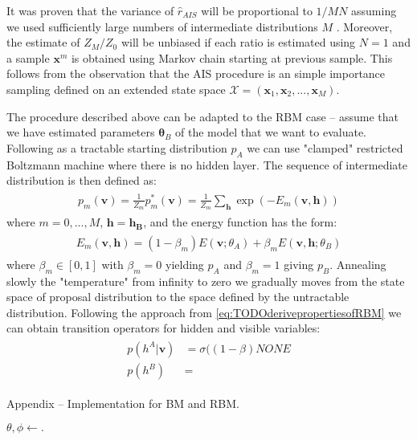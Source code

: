 \documentclass[../report/report.tex]{subfiles}
\begin{document}
It was proven that the variance of $\hat{r}_{AIS}$ will be proportional to $1 / MN$ assuming we used sufficiently large numbers of intermediate distributions $M$ \cite{neal2001annealed}. Moreover, the estimate of $Z_M / Z_0$ will be unbiased if each ratio is estimated using $N=1$ and a sample $\mathbf{x}^{m}$ is obtained using Markov chain starting at previous sample. This follows from the observation that the AIS procedure is an simple importance sampling defined on an extended state space $\mathcal{X} = (\mathbf{x}_1, \mathbf{x}_2, ..., \mathbf{x}_M)$.

The procedure described above can be adapted to the RBM case -- assume that we have estimated parameters $\mathbf{\theta}_B$ of the model that we want to evaluate. Following \cite{salakhutdinov2008quantitative} as a tractable starting distribution $p_A$ we can use "clamped" restricted Boltzmann machine where there is no hidden layer. The sequence of intermediate distribution is then defined as:
 \begin{align}
\begin{split}
p_m(\mathbf{v}) = \frac{1}{Z_m}p^*_m(\mathbf{v}) = \frac{1}{Z_m}\sum_\mathbf{h} \exp(-E_m(\mathbf{v, h}))
\end{split}
\end{align}
where $m = 0, ..., M$, $\mathbf{h} = \mathbf{h_B}$, and the energy function has the form:
 \begin{align}
\begin{split}
E_m(\mathbf{v,h}) = (1- \beta_m) E(\mathbf{v} ;\theta_A) + \beta_m E(\mathbf{v, h} ;\theta_B) 
\end{split}
\end{align}
where $\beta_m \in [0, 1]$ with $\beta_m = 0$ yielding $p_A$ and $\beta_m = 1$ giving $p_B$. Annealing slowly the "temperature" from infinity to zero we  gradually moves from the state space of proposal distribution to the space defined by the untractable distribution. Following the approach from \ref{eq:TODOderivepropertiesofRBM} we can obtain transition operators for hidden and visible variables:
 \begin{align}
\begin{split}
p(h^A | \mathbf{v}) & = \sigma ((1 - \beta) NONE \\
p(h^B) & =
\end{split}
\end{align}

\begin{algorithm}[!bthp]
\caption{Appendix -- Implementation for BM and RBM.}
\label{alg:vae}
\begin{algorithmic}
\State $\theta, \phi \gets .$
\EndWhile
\end{algorithmic}
\end{algorithm}
\end{document}
